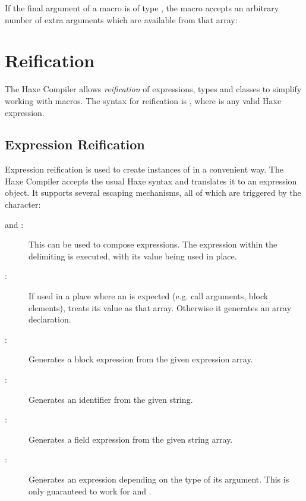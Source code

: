 \documentclass{haxe}
\begin{document}
If the final argument of a macro is of type , the macro accepts an arbitrary number of extra arguments which are available from that array:





\section{Reification}
\label{macro-reification}

The Haxe Compiler allows \emph{reification} of expressions, types and classes to simplify working with macros. The syntax for reification is , where  is any valid Haxe expression.

\subsection{Expression Reification}
\label{macro-reification-expression}

Expression reification is used to create instances of  in a convenient way. The Haxe Compiler accepts the usual Haxe syntax and translates it to an expression object. It supports several escaping mechanisms, all of which are triggered by the \expr{\$} character:

\begin{description}
	\item[\expr{\$\{\}} and :]  This can be used to compose expressions. The expression within the delimiting \expr{\{ \}} is executed, with its value being used in place.
	\item[:]  If used in a place where an  is expected (e.g. call arguments, block elements),  treats its value as that array. Otherwise it generates an array declaration.
	\item[:]  Generates a block expression from the given expression array.
	\item[:]  Generates an identifier from the given string.
	\item[:]  Generates a field expression from the given string array.
	\item[:]  Generates an expression depending on the type of its argument. This is only guaranteed to work for  and .
\end{description}
\end{document}
